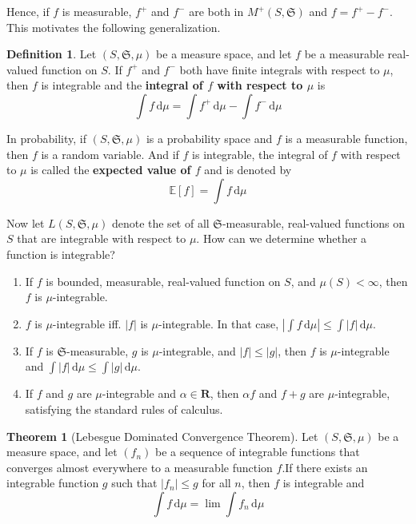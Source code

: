 \documentclass[12pt,a4paper]{article}
\theoremstyle{definition}
\newtheorem{theorem}{Theorem}[section]
\newtheorem{definition}{Definition}[section]
\begin{document}
Hence, if $f$ is measurable, $f^+$ and $f^-$ are both in $M^+(S, \mathfrak{S})$ and $f = f^+ - f^-$. This motivates the following generalization.

\begin{definition}
	Let $(S, \mathfrak{S}, \mu)$ be a measure space, and let $f$ be a measurable real-valued function on $S$. If $f^+$ and $f^-$ both have finite integrals with respect to $\mu$, then $f$ is integrable and the \textbf{integral of $f$ with respect to $\mu$} is 
	\[
		\int f \, \mathrm{d}\mu = \int f^+ \, \mathrm{d}\mu - \int f^- \, \mathrm{d}\mu
	\]
\end{definition}

In probability, if $(S, \mathfrak{S}, \mu)$ is a probability space and $f$ is a measurable function, then $f$ is a random variable. And if $f$ is integrable, the integral of $f$ with respect to $\mu$ is called the \textbf{expected value of $f$} and is denoted by
\[
	\mathbb{E}[f] = \int f \, \mathrm{d}\mu
\]

Now let $L(S, \mathfrak{S}, \mu)$ denote the set of all $\mathfrak{S}$-measurable, real-valued functions on $S$ that are integrable with respect to $\mu$. How can we determine whether a function is integrable?

\begin{enumerate}
	\item If $f$ is bounded, measurable, real-valued function on $S$, and $\mu(S) < \infty$, then $f$ is $\mu$-integrable.
	\item $f$ is $\mu$-integrable iff. $|f|$ is $\mu$-integrable. In that case, $| \int f \, \mathrm{d}\mu| \leq \int |f| \, \mathrm{d}\mu$.
	\item If $f$ is $\mathfrak{S}$-measurable, $g$ is $\mu$-integrable, and $|f| \leq |g|$, then $f$ is $\mu$-integrable and $\int |f| \, \mathrm{d}\mu \leq \int |g| \, \mathrm{d}\mu$.
	\item If $f$ and $g$ are $\mu$-integrable and $\alpha \in \textbf{R}$, then $\alpha f$ and $f + g$ are $\mu$-integrable, satisfying the standard rules of calculus.
\end{enumerate}

\begin{theorem}[Lebesgue Dominated Convergence Theorem]
	Let $(S, \mathfrak{S}, \mu)$ be a measure space, and let $(f_n)$ be a sequence of integrable functions that converges almost everywhere to a measurable function $f$.If there exists an integrable function $g$ such that $|f_n| \leq g$ for all $n$, then $f$ is integrable and
	\[
		\int f \, \mathrm{d}\mu = \lim \int f_n \, \mathrm{d}\mu
	\]
\end{theorem}
\end{document}
